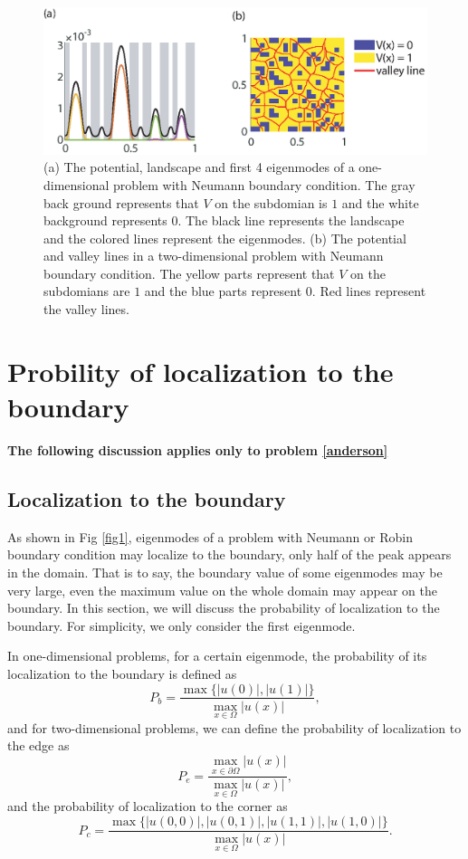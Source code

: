 \documentclass[a4paper,11pt]{article}
\begin{document}
\begin{figure}
\centering
\includegraphics[width=\linewidth]{Fig2.eps}
\caption{(a) The potential, landscape and first 4 eigenmodes of a one-dimensional problem with Neumann boundary condition. The gray back ground represents that $V$ on the subdomian is $1$ and the white background represents $0$. The black line represents the landscape and the colored lines represent the eigenmodes. (b) The potential and valley lines in a two-dimensional problem with Neumann boundary condition. The yellow parts represent that $V$ on the subdomians are $1$ and the blue parts represent $0$. Red lines represent the valley lines.}
\label{fig2}
\end{figure}

\section{Probility of localization to the boundary}\label{prob}

\textbf{\color{red} The following discussion applies only to problem \eqref{anderson}}

\subsection{Localization to the boundary}

As shown in Fig \ref{fig1}, eigenmodes of a problem with Neumann or Robin boundary condition may localize to the boundary, only half of the peak appears in the domain. That is to say, the boundary value of some eigenmodes may be very large, even the maximum value on the whole domain may appear on the boundary. In this section, we will discuss the probability of localization to the boundary. For simplicity, we only consider the first eigenmode.

In one-dimensional problems, for a certain eigenmode, the probability of its localization to the boundary is defined as
\begin{equation}
P_b = \frac{\max\{|u(0)|, |u(1)|\}}{\max_{x \in \Omega} |u(x)|},
\end{equation}
and for two-dimensional problems, we can define the probability of localization to the edge as
\begin{equation}
P_e = \frac{\max_{x \in \partial\Omega} |u(x)|}{\max_{x \in \Omega} |u(x)|},
\end{equation}
and the probability of localization to the corner as
\begin{equation}
P_c = \frac{\max\{|u(0,0)|, |u(0,1)|, |u(1,1)|, |u(1,0)|\}}{\max_{x \in \Omega} |u(x)|}.
\end{equation}
\end{document}
